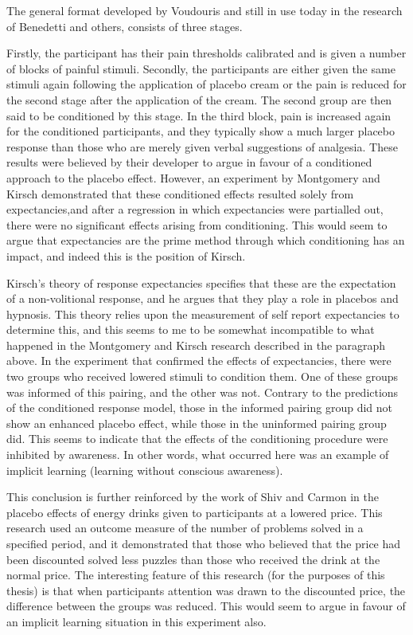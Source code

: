The general format developed by Voudouris and still in use today in the research of Benedetti \cite{Benedetti2006c} and others, consists of three stages. 

Firstly, the participant has their pain thresholds calibrated and is given a number of blocks of painful stimuli. Secondly, the participants are either given the same stimuli again following the application of placebo cream or the pain is reduced for the second stage after the application of the cream. The second group are then said to be conditioned by this stage. In the third block, pain is increased again for the conditioned participants, and they typically show a much larger placebo response than those who are merely given verbal suggestions of analgesia.  These results were believed by their developer to argue in favour of a conditioned approach to the placebo effect. However, an experiment by Montgomery and Kirsch \cite{Montgomery1997} demonstrated that these conditioned effects resulted solely from expectancies,and after a regression in which expectancies were partialled out, there were no significant effects arising from conditioning. This would seem to argue that expectancies are the prime method through which conditioning has an impact, and indeed this is the position of Kirsch. 

Kirsch's \cite{Kirsch1985,Kirsch1997} theory of response expectancies specifies that these are the expectation of a non-volitional response, and he argues that they play a role in placebos and hypnosis. This theory  relies upon the measurement of self report expectancies to determine this, and this seems to me to be somewhat incompatible to what happened in the Montgomery and Kirsch research described in the paragraph above. In the experiment that confirmed the effects of expectancies, there were two groups who received lowered stimuli to condition them. One of these groups was informed of this pairing, and the other was not. Contrary to the predictions of the conditioned response model, those in the informed pairing group did not show an enhanced placebo effect, while those in the uninformed pairing group did. This seems to indicate that the effects of the conditioning procedure were inhibited by awareness. In other words, what occurred here was an example of implicit learning (learning without conscious awareness).

This conclusion is further reinforced by the work of Shiv and Carmon \cite{Shiv2005a} in the placebo effects of energy drinks given to participants at a lowered price. This research used an outcome measure of the number of problems solved in a specified period, and it demonstrated that those who believed that the price had been discounted solved less puzzles than those who received the drink at the normal price. The interesting feature of this research (for the purposes of this thesis) is that when participants attention was drawn to the discounted price, the difference between the groups was reduced. This would seem to argue in favour of an implicit learning situation in this experiment also. 


